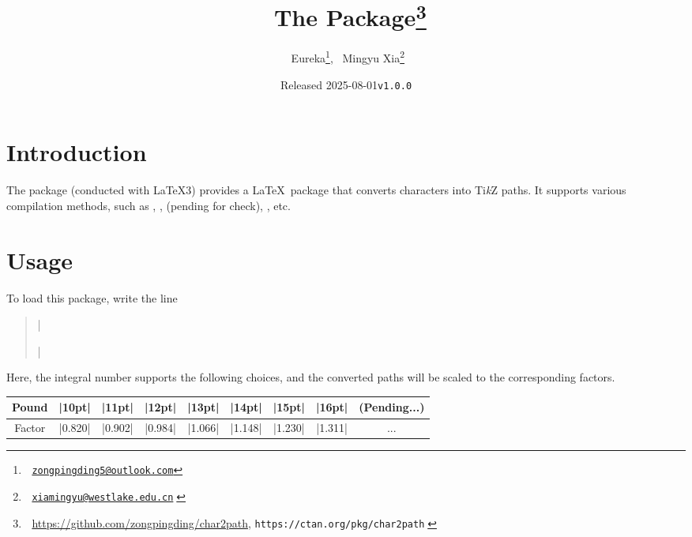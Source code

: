 \documentclass[lm-default]{l3doc}
\title{^^A
  The \pkg{char2path} Package\thanks{^^A
    \url{https://github.com/zongpingding/char2path},
    \texttt{https://ctan.org/pkg/char2path}^^A
  }^^A
}
\author{^^A
  Eureka\thanks{^^A
    \href{mailto:zongpingding5@outlook.com}{\texttt{zongpingding5@outlook.com}}},~
  Mingyu Xia\thanks{^^A
    \href{mailto:xiamingyu@westlake.edu.cn}{\texttt{xiamingyu@westlake.edu.cn}}^^A
  }^^A
}
\date{Released 2025-08-01\quad \texttt{v1.0.0}}
\begin{document}
\maketitle

\begin{documentation}

\section{Introduction}

The  package (conducted with \LaTeX3) provides
a \LaTeX\ package that converts characters into Ti\textit k\/Z paths.
It supports various compilation methods, such as ,
,  (pending for check), , etc.

\section{Usage}

To load this package, write the line
\begin{quote}
  |\usepackage[scale = ||pt]{char2path}|
\end{quote}

Here, the integral number  supports the following choices,
and the converted paths will be scaled to the corresponding factors.

\begin{center}
  \begin{tabular}{*9c}
    \toprule
    Pound   & |10pt|  & |11pt|  & |12pt|  &
    |13pt|  & |14pt|  & |15pt|  & |16pt|  & (Pending...)\\
    \midrule
    Factor  & |0.820| & |0.902| & |0.984| &
    |1.066| & |1.148| & |1.230| & |1.311| & ...\\
    \bottomrule
  \end{tabular}
\end{center}


\end{documentation}
\end{document}

